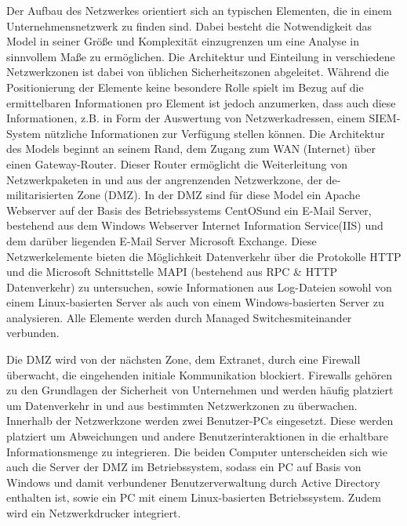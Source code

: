 Der Aufbau des Netzwerkes orientiert sich an typischen Elementen, die in einem Unternehmensnetzwerk zu finden sind. Dabei besteht die Notwendigkeit das Model in seiner Größe und Komplexität einzugrenzen um eine Analyse in sinnvollem Maße zu ermöglichen. 
Die Architektur und Einteilung in verschiedene Netzwerkzonen ist dabei von üblichen Sicherheitszonen abgeleitet. Während die Positionierung der Elemente keine besondere Rolle spielt im Bezug auf die ermittelbaren Informationen pro Element ist jedoch anzumerken, dass auch diese Informationen, z.B. in Form der Auswertung von Netzwerkadressen, einem SIEM-System nützliche Informationen zur Verfügung stellen können. Die Architektur des Models beginnt an seinem \glqq Rand\grqq , dem Zugang zum WAN (Internet) über einen Gateway-Router. Dieser Router ermöglicht die Weiterleitung von Netzwerkpaketen in und aus der angrenzenden Netzwerkzone, der de-militarisierten Zone (DMZ). 
In der DMZ sind für diese Model ein Apache Webserver auf der Basis des Betriebssystems \glqq CentOS\grqq  und ein E-Mail Server, bestehend aus dem Windows Webserver \glqq Internet Information Service\grqq  (IIS) und dem darüber liegenden E-Mail Server \glqq Microsoft Exchange\grqq . Diese Netzwerkelemente bieten die Möglichkeit Datenverkehr über die Protokolle HTTP und die Microsoft Schnittstelle MAPI (bestehend aus RPC \& HTTP Datenverkehr) zu untersuchen, sowie Informationen aus Log-Dateien sowohl von einem Linux-basierten Server als auch von einem Windows-basierten Server zu analysieren. Alle Elemente werden durch \glqq Managed Switches\grqq  miteinander verbunden.

Die DMZ wird von der nächsten Zone, dem Extranet, durch eine Firewall überwacht, die eingehenden initiale Kommunikation blockiert. Firewalls gehören zu den Grundlagen der Sicherheit von Unternehmen und werden häufig platziert um Datenverkehr in und aus bestimmten Netzwerkzonen zu überwachen. Innerhalb der Netzwerkzone werden zwei Benutzer-PCs eingesetzt. Diese werden platziert um Abweichungen und andere Benutzerinteraktionen in die erhaltbare Informationsmenge zu integrieren. Die beiden Computer unterscheiden sich wie auch die Server der DMZ im Betriebssystem, sodass ein PC auf Basis von Windows und damit verbundener Benutzerverwaltung durch Active Directory enthalten ist, sowie ein PC mit einem Linux-basierten Betriebssystem. Zudem wird ein Netzwerkdrucker integriert.


